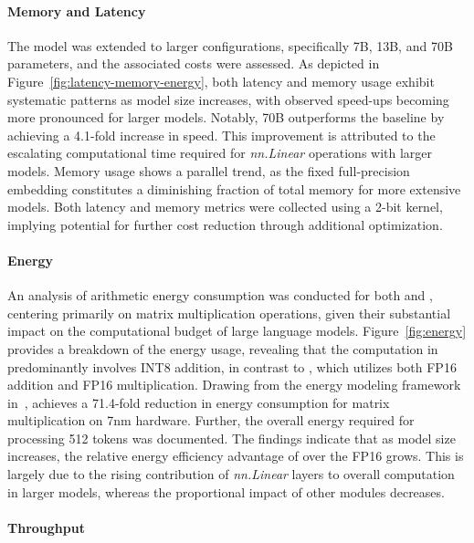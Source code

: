 \paragraph{Memory and Latency}

The model was extended to larger configurations, specifically 7B, 13B, and 70B parameters, and the associated costs were assessed. As depicted in Figure~\ref{fig:latency-memory-energy}, both latency and memory usage exhibit systematic patterns as model size increases, with observed speed-ups becoming more pronounced for larger models. Notably,  70B outperforms the  baseline by achieving a 4.1-fold increase in speed. This improvement is attributed to the escalating computational time required for \emph{nn.Linear} operations with larger models. Memory usage shows a parallel trend, as the fixed full-precision embedding constitutes a diminishing fraction of total memory for more extensive models. Both latency and memory metrics were collected using a 2-bit kernel, implying potential for further cost reduction through additional optimization.

\paragraph{Energy}

An analysis of arithmetic energy consumption was conducted for both  and , centering primarily on matrix multiplication operations, given their substantial impact on the computational budget of large language models. Figure~\ref{fig:energy} provides a breakdown of the energy usage, revealing that the computation in  predominantly involves INT8 addition, in contrast to , which utilizes both FP16 addition and FP16 multiplication. Drawing from the energy modeling framework in~\cite{energycost, pokebnn},  achieves a 71.4-fold reduction in energy consumption for matrix multiplication on 7nm hardware. Further, the overall energy required for processing 512 tokens was documented. The findings indicate that as model size increases, the relative energy efficiency advantage of  over the FP16  grows. This is largely due to the rising contribution of \emph{nn.Linear} layers to overall computation in larger models, whereas the proportional impact of other modules decreases.

\paragraph{Throughput}

